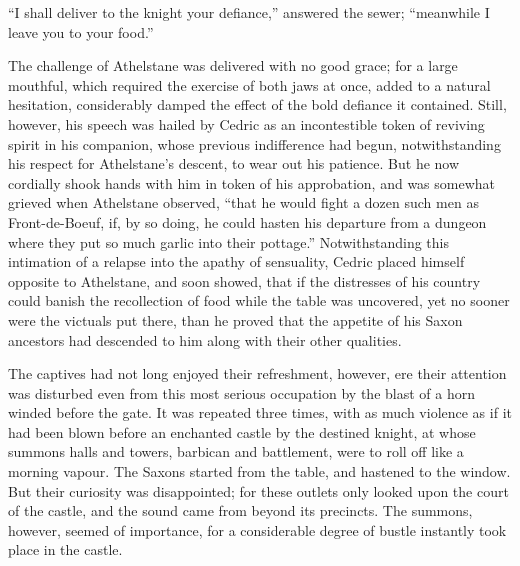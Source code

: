 ``I shall deliver to the knight your defiance,'' answered the sewer;
``meanwhile I leave you to your food.''

The challenge of Athelstane was delivered with no good grace; for a
large mouthful, which required the exercise of both jaws at once, added
to a natural hesitation, considerably damped the effect of the bold
defiance it contained. Still, however, his speech was hailed by Cedric
as an incontestible token of reviving spirit in his companion, whose
previous indifference had begun, notwithstanding his respect for
Athelstane's descent, to wear out his patience. But he now cordially
shook hands with him in token of his approbation, and was somewhat
grieved when Athelstane observed, ``that he would fight a dozen such men
as Front-de-Boeuf, if, by so doing, he could hasten his departure from a
dungeon where they put so much garlic into their pottage.''
Notwithstanding this intimation of a relapse into the apathy of
sensuality, Cedric placed himself opposite to Athelstane, and soon
showed, that if the distresses of his country could banish the
recollection of food while the table was uncovered, yet no sooner were
the victuals put there, than he proved that the appetite of his Saxon
ancestors had descended to him along with their other qualities.

The captives had not long enjoyed their refreshment, however, ere their
attention was disturbed even from this most serious occupation by the
blast of a horn winded before the gate. It was repeated three times,
with as much violence as if it had been blown before an enchanted castle
by the destined knight, at whose summons halls and towers, barbican and
battlement, were to roll off like a morning vapour. The Saxons started
from the table, and hastened to the window. But their curiosity was
disappointed; for these outlets only looked upon the court of the
castle, and the sound came from beyond its precincts. The summons,
however, seemed of importance, for a considerable degree of bustle
instantly took place in the castle.
